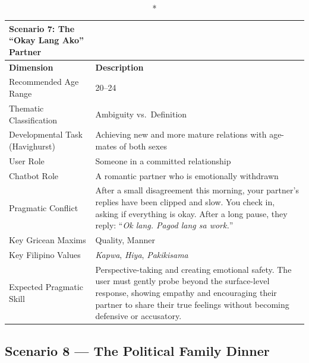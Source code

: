 \begin{longtable}{p{4.5cm} p{11cm}}
\caption*{Scenario 7: The ``Okay Lang Ako'' Partner} \\
\toprule
\textbf{Dimension} & \textbf{Description} \\
\midrule
\endhead
Recommended Age Range          & 20--24 \\
\midrule
Thematic Classification        & Ambiguity vs.\ Definition \\
\midrule
Developmental Task (Havighurst)& Achieving new and more mature relations with age-mates of both sexes \\
\midrule
User Role                      & Someone in a committed relationship \\
\midrule
Chatbot Role                   & A romantic partner who is emotionally withdrawn \\
\midrule
Pragmatic Conflict             & After a small disagreement this morning, your partner's replies have been
                                 clipped and slow. You check in, asking if everything is okay. After a
                                 long pause, they reply: ``\textit{Ok lang. Pagod lang sa work.}'' \\
\midrule
Key Gricean Maxims             & Quality, Manner \\
\midrule
Key Filipino Values            & \textit{Kapwa}, \textit{Hiya}, \textit{Pakikisama} \\
\midrule
Expected Pragmatic Skill       & Perspective-taking and creating emotional safety. The user must gently
                                 probe beyond the surface-level response, showing empathy and encouraging
                                 their partner to share their true feelings without becoming defensive or
                                 accusatory. \\
\bottomrule
\end{longtable}
 
\subsection*{Scenario 8 --- The Political Family Dinner}
 
